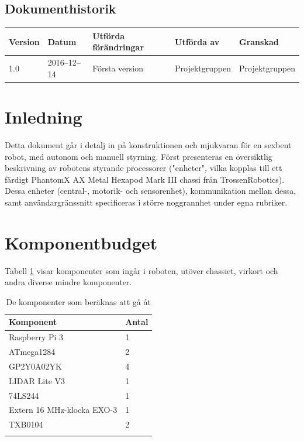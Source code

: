 \documentclass[a4paper,titlepage,12pt]{article}
\begin{document}
\begin{center}

		\section*{Dokumenthistorik}
		\renewcommand*{\arraystretch}{1.4}
        \begin{longtable}[c]{ l l >{\raggedright}p{5cm} >{\raggedright}p{3cm} l }
			\textbf{Version} & \textbf{Datum} & \textbf{Utförda förändringar} 
			& \textbf{Utförda av} & \textbf{Granskad} \\ \midrule
			
			1.0 & 2016--12--14 & Första version & Projektgruppen &
            Projektgruppen \\
            
		\end{longtable}
	\end{center}


	\newpage

	\raggedright

	\section{Inledning}
	Detta dokument går i detalj in på konstruktionen och mjukvaran för en 
	sexbent robot, med autonom och manuell styrning. Först presenteras en 
	översiktlig beskrivning av robotens styrande processorer ("enheter", vilka kopplas till ett färdigt 
	PhantomX AX Metal Hexapod Mark III chassi från TrossenRobotics). Dessa enheter (central-, 
	motorik- och sensorenhet), kommunikation mellan dessa, samt användargränssnitt specificeras 
	i större noggrannhet under egna rubriker.
	
	\section{Komponentbudget}
	
	Tabell \ref{table:components} visar komponenter som ingår i
	roboten, utöver chassiet, virkort och andra diverse
	mindre komponenter.
	
	\begin{longtable}[c]{l l}
		\textbf{Komponent} & \textbf{Antal} \\ \midrule
		Raspberry Pi 3 & 1 \\
		ATmega1284 & 2 \\
		GP2Y0A02YK & 4 \\
		LIDAR Lite V3 & 1 \\
		74LS244 & 1 \\
		Extern 16 MHz-klocka EXO-3 & 1 \\
		TXB0104 & 2 \\
		\caption{De komponenter som beräknas att gå åt \label{table:components}}
	\end{longtable}
\end{document}
